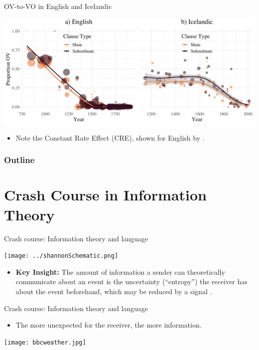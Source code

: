 \documentclass[hyperref={pdfpagelabels=false}]{beamer}
\begin{document}
\begin{frame}{OV-to-VO in English and Icelandic} 
	
	
	\includegraphics[width=1.04\textwidth]{FullClauseFig.png}
	\begin{itemize}
		\item Note the Constant Rate Effect (CRE), shown for English by \citet{pintzuktaylor2006}.
	\end{itemize}	
\end{frame}




\begin{frame}
	\frametitle{Outline}
	\tableofcontents
\end{frame}


\section{Crash Course in Information Theory}

\begin{frame}{Crash course: Information theory and language} 

\begin{center}

	\texttt{[image: ../shannonSchematic.png]} 


\end{center}\pause
\begin{itemize}
	\item \textbf{Key Insight:} The amount of information a sender can theoretically communicate about an event is the uncertainty (``entropy'') the receiver has about the event beforehand, which may be reduced by a signal \citep{hartley1928, shannon1948}.
\end{itemize}


\end{frame}

\begin{frame}{Crash course: Information theory and language} 
	\begin{itemize}
		\item The more unexpected for the receiver, the more information.\pause
	\end{itemize}
	\begin{center}
			\texttt{[image: bbcweather.jpg]} 
	\end{center}
\end{frame}
\end{document}
